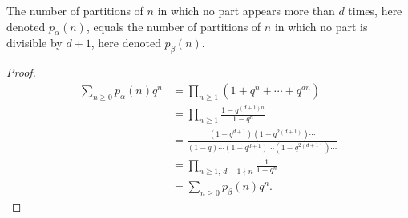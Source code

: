 \begin{theorem}\label{thm:glashiers-thm}
    The number of partitions of $n$ in which no part appears more than $d$ times,
    here denoted $p_\alpha(n)$,
    equals
    the number of partitions of $n$ in which no part is divisible by $d+1$,
    here denoted $p_\beta(n)$.
\end{theorem}

\begin{proof}
    \begin{align*}
        \sum_{n\ge 0} p_\alpha(n)q^n &= \prod_{n\ge 1}\left(1+q^n+\cdots+q^{dn}\right)\\[0.5em]
        &= \prod_{n\ge 1}\frac{1-q^{(d+1)n}}{1-q^n}\\[0.5em]
        &= \frac{(1-q^{d+1})(1-q^{2(d+1)})\cdots}{(1-q)\cdots(1-q^{d+1})\cdots(1-q^{2(d+1)})\cdots}\\[0.5em]
        &= \prod_{n\ge 1,\,d+1\nmid n}\frac{1}{1-q^n}\\[0.5em]
        &= \sum_{n\ge 0} p_\beta(n)q^n.
    \end{align*}
\end{proof}



